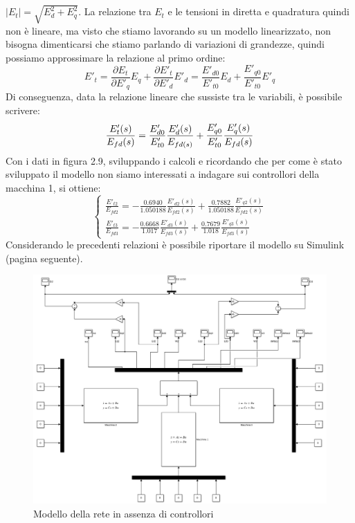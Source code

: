 \documentclass[Lau,noexaminfo]{sapthesis}
\begin{document}
	$|E_t|=\sqrt{E_d^2+E_q^2}$. La relazione tra $E_t$ e le tensioni in diretta e quadratura quindi non è lineare, ma visto che stiamo lavorando su un modello linearizzato, non bisogna dimenticarsi che stiamo parlando di variazioni di grandezze, quindi possiamo approssimare la relazione al primo ordine:\\
	\begin{equation*}
	E'_t=\frac{\partial E_t}{\partial E'_q}E_q+\frac{\partial E'_t}{\partial E'_d}E'_d= \frac{E'_{d0}}{E'_{t0}}E_d+\frac{E'_{q0}}{E'_{t0}}E'_q
	\end{equation*}
	Di conseguenza, data la relazione lineare che sussiste tra le variabili, è possibile scrivere:
	\begin{equation}
	\frac{E'_t(s)}{E_{fd}(s)}=\frac{E'_{d0}}{E'_{t0}}\frac{E'_d(s)}
	{E_{fd(s)}}+\frac{E'_{q0}}{E'_{t0}}\frac{E'_q(s)}{E_{fd}(s)}\\
	\end{equation}
	Con i dati in figura 2.9, sviluppando i calcoli e ricordando che per come è stato sviluppato il modello non siamo interessati a indagare sui controllori della macchina 1, si ottiene:\\
	\begin{equation*}
	\begin{cases}
	\frac{E'_{t2}}{E_{fd2}}=-\frac{0.6940}{1.050188}\frac{E'_{d2}(s)}{E_{fd2}(s)}+\frac{0.7882}{1.050188}\frac{E'_{q2}(s)}{E_{fd2}(s)}\\
	\frac{E'_{t3}}{E_{fd3}}=-\frac{0.6668}{1.017}\frac{E'_{d3}(s)}{E_{fd3}(s)}+\frac{0.7679}{1.018}\frac{E'_{q3}(s)}{E_{fd3}(s)}
	\end{cases}
	\end{equation*}
	Considerando le precedenti relazioni è possibile riportare il modello su Simulink (pagina seguente).
	\begin{figure}
		\centering
		\includegraphics[height=0.6\textheight,angle=-90]{Macchina_non_regolata}
		\caption{Modello della rete in assenza di controllori}
	\end{figure}
\end{document}
